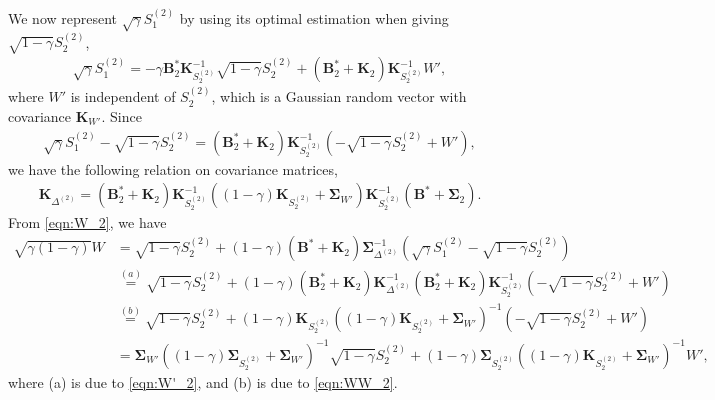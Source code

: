 \documentclass[journal,final, onecolumn]{IEEEtran}
\begin{document}
We now represent $\sqrt{\gamma}S^{(2)}_1$ by using its optimal estimation when giving $\sqrt{1-\gamma}S^{(2)}_2$,
\begin{align}
\sqrt{\gamma}S^{(2)}_1 = -\gamma \boldsymbol{B}_{2}^{*} \boldsymbol{K}_{S^{(2)}_2}^{-1} \sqrt{1-\gamma}S^{(2)}_{2} + \left(  \boldsymbol{B}_{2}^{*} + \boldsymbol{K}_{2}         \right)\boldsymbol{K}_{S^{(2)}_2}^{-1} W',\label{eqn:S1_2}
\end{align}
where $W'$ is independent of $S^{(2)}_{2}$, which is a Gaussian random vector with covariance $\boldsymbol{K}_{W'}$.
Since
\begin{align}
\sqrt{\gamma}S^{(2)}_1 -  \sqrt{1-\gamma}S^{(2)}_{2} = \left(  \boldsymbol{B}_{2}^{*} + \boldsymbol{K}_{2}         \right)\boldsymbol{K}_{S^{(2)}_2}^{-1} \left( -\sqrt{1-\gamma}S^{(2)}_{2} + W'\right),\label{eqn:W'_2}
\end{align}
we have the following relation on covariance matrices,
\begin{align}
\boldsymbol{K}_{\Delta^{(2)}} = \left(  \boldsymbol{B}_2^{*} + \boldsymbol{K}_{2}         \right)\boldsymbol{K}_{S^{(2)}_2}^{-1} \left(     (1-\gamma)\boldsymbol{K}_{S^{(2)}_2} +\boldsymbol{\Sigma}_{W'}    \right)\boldsymbol{K}_{S^{(2)}_2}^{-1}\left(  \boldsymbol{B}^{*} + \boldsymbol{\Sigma}_{2}         \right). \label{eqn:WW_2}
\end{align}
From \eqref{eqn:W_2}, we have
\begin{align}
 \sqrt{\gamma (1-\gamma)} W &= \sqrt{1-\gamma} S^{(2)}_2 +(1-\gamma) (\boldsymbol{B}^{*} + \boldsymbol{K}_{2}) \boldsymbol{\Sigma}_{\Delta^{(2)}}^{-1}\left(    \sqrt{\gamma}S^{(2)}_{1} - \sqrt{1-\gamma}S^{(2)}_{2}  \right) \\
 &\overset{(a)}=\sqrt{1-\gamma} S^{(2)}_2 +(1-\gamma) (\boldsymbol{B}_2^{*} + \boldsymbol{K}_{2}) \boldsymbol{K}_{\Delta^{(2)}}^{-1}\left(  \boldsymbol{B}_2^{*} + \boldsymbol{K}_{2}         \right)\boldsymbol{K}^{-1}_{S^{(2)}_2} \left( -\sqrt{1-\gamma}S^{(2)}_{2} + W'\right) \\
 &\overset{(b)} = \sqrt{1-\gamma} S^{(2)}_2 +(1-\gamma)\boldsymbol{K}_{S^{(2)}_2} \left(     (1-\gamma) \boldsymbol{K}_{S^{(2)}_2} + \boldsymbol{\Sigma}_{W'}    \right)^{-1}\left( -\sqrt{1-\gamma}S^{(2)}_{2} + W'\right)\\
 &=\boldsymbol{\Sigma}_{W'} \left(     (1-\gamma) \boldsymbol{\Sigma}_{S^{(2)}_2} + \boldsymbol{\Sigma}_{W'}    \right)^{-1}\sqrt{1-\gamma}S^{(2)}_{2} + (1-\gamma)\boldsymbol{\Sigma}_{S^{(2)}_2} \left(     (1-\gamma)\boldsymbol{K}_{S_2^{(2)}} + \boldsymbol{\Sigma}_{W'}    \right)^{-1}W',
\end{align}
where (a) is due to \eqref{eqn:W'_2}, and (b) is due to \eqref{eqn:WW_2}.
\end{document}
